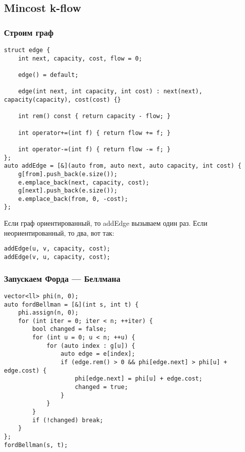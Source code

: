 \subsection{Mincost k-flow}
\subsubsection{Строим граф}
\begin{lstlisting}
struct edge {
    int next, capacity, cost, flow = 0;

    edge() = default;

    edge(int next, int capacity, int cost) : next(next), capacity(capacity), cost(cost) {}

    int rem() const { return capacity - flow; }

    int operator+=(int f) { return flow += f; }

    int operator-=(int f) { return flow -= f; }
};
auto addEdge = [&](auto from, auto next, auto capacity, int cost) {
    g[from].push_back(e.size());
    e.emplace_back(next, capacity, cost);
    g[next].push_back(e.size());
    e.emplace_back(from, 0, -cost);
};
\end{lstlisting}
Если граф ориентированный, то addEdge вызываем один раз.
Если неориентированный, то два, вот так:
\begin{lstlisting}
addEdge(u, v, capacity, cost);
addEdge(v, u, capacity, cost);
\end{lstlisting}
\subsubsection{Запускаем Форда --- Беллмана}
\begin{lstlisting}
vector<ll> phi(n, 0);
auto fordBellman = [&](int s, int t) {
    phi.assign(n, 0);
    for (int iter = 0; iter < n; ++iter) {
        bool changed = false;
        for (int u = 0; u < n; ++u) {
            for (auto index : g[u]) {
                auto edge = e[index];
                if (edge.rem() > 0 && phi[edge.next] > phi[u] + edge.cost) {
                    phi[edge.next] = phi[u] + edge.cost;
                    changed = true;
                }
            }
        }
        if (!changed) break;
    }
};
fordBellman(s, t);
\end{lstlisting}

